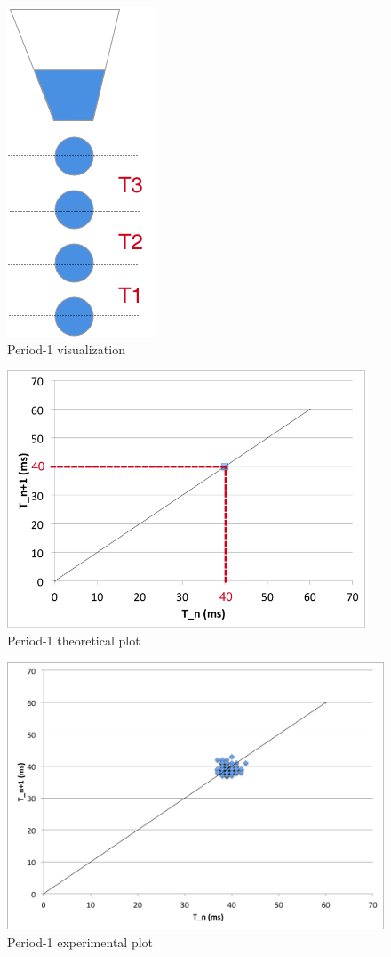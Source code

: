 \documentclass[11pt]{article}
\begin{document}
\newpage
\begin{figure}[htp]
\begin{center}
\includegraphics[width=.9in]{figs/periodic_schematic}
\caption{ Period-1 visualization}
\label{periodic_schematic}
\end{center}
\end{figure}

\begin{figure}[htp]
\begin{center}
\includegraphics[width=4.2in]{figs/periodic_th}
\caption{ Period-1 theoretical plot}
\label{periodic_th}
\end{center}
\end{figure}

\newpage
\begin{figure}[htp]
\begin{center}
\includegraphics[width=6in]{figs/periodic}
\caption{ Period-1 experimental plot}
\label{periodic_exp}
\end{center}
\end{figure}
\end{document}
